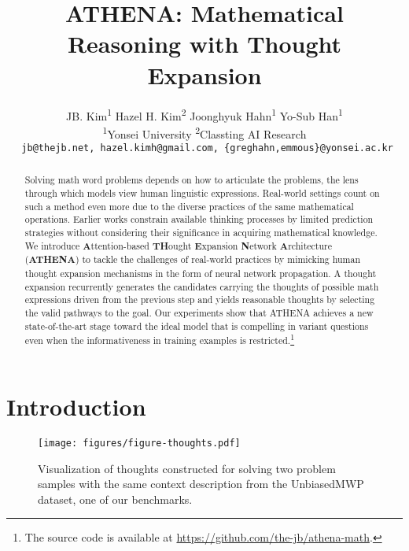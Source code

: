 \documentclass[11pt]{article}
\title{ATHENA: Mathematical Reasoning with Thought Expansion}
\author{
JB. Kim\textsuperscript{1} \qquad
Hazel H. Kim\textsuperscript{2} \qquad
Joonghyuk Hahn\textsuperscript{1} \qquad
Yo-Sub Han\textsuperscript{1}\\
\textsuperscript{1}Yonsei University \qquad
\textsuperscript{2}Classting AI Research  \\
\texttt{
jb@thejb.net,
hazel.kimh@gmail.com,
\{greghahn,emmous\}@yonsei.ac.kr} 
}
\newcommand{\1}{\mathbb{1}}
\begin{document}
\maketitle
\begin{abstract}
Solving math word problems depends on how to articulate the problems, the lens through which models view human linguistic expressions.
Real-world settings count on such a method even more due to the diverse practices of the same mathematical operations.
Earlier works constrain available thinking processes by limited prediction strategies without considering their significance in acquiring mathematical knowledge.
We introduce \textbf{A}ttention-based \textbf{TH}ought \textbf{E}xpansion \textbf{N}etwork \textbf{A}rchitecture (\textbf{ATHENA}) to tackle the challenges of real-world practices by mimicking human thought expansion mechanisms in the form of neural network propagation.
A thought expansion recurrently generates the candidates carrying the thoughts of possible math expressions driven from the previous step and yields reasonable thoughts by selecting the valid pathways to the goal.
Our experiments show that ATHENA achieves a new state-of-the-art stage toward the ideal model that is compelling in variant questions even when the informativeness in training examples is restricted.\footnote{The source code is available at \url{https://github.com/the-jb/athena-math}.}
\end{abstract}


\section{Introduction}

\begin{figure}[t]
    \centering
    \texttt{[image: figures/figure-thoughts.pdf]}
    \vspace{-1.5em}
    \caption{Visualization of thoughts constructed for solving two problem samples with the same context description from the UnbiasedMWP dataset, one of our benchmarks.}
    \label{fig:thoughts}
\end{figure}
\end{document}

